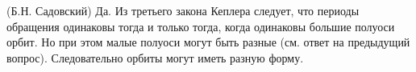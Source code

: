 (Б.Н. Садовский)
Да. Из третьего закона Кеплера следует, что периоды обращения одинаковы
тогда и только тогда, когда одинаковы большие полуоси орбит. Но при этом
малые полуоси могут быть разные (см. ответ на предыдущий вопрос). Следовательно
орбиты могут иметь разную форму.
